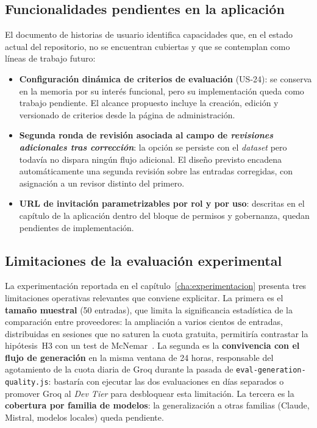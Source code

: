 \subsection{Funcionalidades pendientes en la aplicación}

El documento de historias de usuario identifica capacidades que, en el estado
actual del repositorio, no se encuentran cubiertas y que se contemplan como
líneas de trabajo futuro:

\begin{itemize}
	\item \textbf{Configuración dinámica de criterios de evaluación} (US-24): se conserva
	      en la memoria por su interés funcional, pero su implementación queda como
	      trabajo pendiente. El alcance propuesto incluye la creación, edición y
	      versionado de criterios desde la página de administración.
	\item \textbf{Segunda ronda de revisión asociada al campo de \textit{revisiones
			      adicionales tras corrección}}: la opción se persiste con el \textit{dataset}
	      pero todavía no dispara ningún flujo adicional. El diseño previsto encadena
	      automáticamente una segunda revisión sobre las entradas corregidas, con
	      asignación a un revisor distinto del primero.
	\item \textbf{URL de invitación parametrizables por rol y por uso}: descritas en el
	      capítulo de la aplicación dentro del bloque de permisos y gobernanza, quedan
	      pendientes de implementación.
\end{itemize}

\subsection{Limitaciones de la evaluación experimental}

La experimentación reportada en el capítulo~\ref{cha:experimentacion} presenta
tres limitaciones operativas relevantes que conviene explicitar. La primera es
el \textbf{tamaño muestral} (50 entradas), que limita la significancia
estadística de la comparación entre proveedores: la ampliación a varios cientos
de entradas, distribuidas en sesiones que no saturen la cuota gratuita,
permitiría contrastar la hipótesis~H3 con un test de
McNemar~\cite{McNemar1947}. La segunda es la \textbf{convivencia con el flujo
	de generación} en la misma ventana de 24 horas, responsable del agotamiento de
la cuota diaria de Groq durante la pasada de
\texttt{eval-generation-quality.js}: bastaría con ejecutar las dos evaluaciones
en días separados o promover Groq al \textit{Dev Tier} para desbloquear esta
limitación. La tercera es la \textbf{cobertura por familia de modelos}: la
generalización a otras familias (Claude, Mistral, modelos locales) queda
pendiente.

